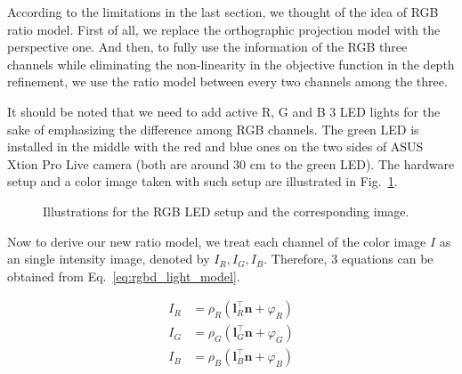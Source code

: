According to the limitations in the last section, we thought of the idea of RGB ratio model.
First of all, we replace the orthographic projection model with the perspective one.
And then, to fully use the information of the RGB three channels while eliminating the non-linearity in the objective function in the depth refinement, we use the ratio model between every two channels among the three.

It should be noted that we need to add active R, G and B 3 LED lights for the sake of emphasizing the difference among RGB channels.
The green LED is installed in the middle with the red and blue ones on the two sides of ASUS Xtion Pro Live camera (both are around 30 cm to the green LED).
The hardware setup and a color image taken with such setup are illustrated in Fig.~\ref{fig:ratio_setup}.

\begin{figure}[!htbp]
\centering
{}
\caption{Illustrations for the RGB LED setup and the corresponding image.}
\label{fig:ratio_setup}
\end{figure}


Now to derive our new ratio model, we treat each channel of the color image $I$ as an single intensity image, denoted by $I_R, I_G, I_B$.
Therefore, 3 equations can be obtained from Eq.~\ref{eq:rgbd_light_model}.

\begin{equation}\label{eq:ratio_prepare}
    \begin{split}
	I_R &= \rho_R(\mathbf{l}_R^\top \mathbf{n} + \varphi_R)\\
	I_G &= \rho_G(\mathbf{l}_G^\top \mathbf{n} + \varphi_G)\\
	I_B &= \rho_B(\mathbf{l}_B^\top \mathbf{n} + \varphi_B)
    \end{split}
\end{equation}

